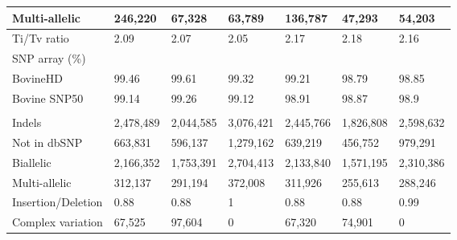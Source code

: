 \documentclass[../main.tex]{subfiles}
\begin{document}
\begin{landscape}
\begin{table}
\begin{tabular}{|l|l|l|l|l|l|l|}
    \hline
    Multi-allelic         & 246,220               & 67,328                      & 63,789                    & 136,787               & 47,293                      & 54,203                     \\ 
    \hline
    Ti/Tv ratio           & 2.09                  & 2.07                        & 2.05                      & 2.17                  & 2.18                        & 2.16                       \\ 
    \hline
    SNP array (\%)        &                       &                             &                           &                       &                             &                            \\ 
    \hline
    BovineHD              & 99.46                 & 99.61                       & 99.32                     & 99.21                 & 98.79                       & 98.85                      \\ 
    \hline
    Bovine SNP50          & 99.14                 & 99.26                       & 99.12                     & 98.91                 & 98.87                       & 98.9                       \\ 
    \hline
    \multicolumn{7}{|l|}{}                                                                                                                                                                     \\ 
    \hline
    Indels                & 2,478,489             & 2,044,585                   & 3,076,421                 & 2,445,766             & 1,826,808                   & 2,598,632                  \\ 
    \hline
    Not in dbSNP          & 663,831               & 596,137                     & 1,279,162                 & 639,219               & 456,752                     & 979,291                    \\ 
    \hline
    Biallelic             & 2,166,352             & 1,753,391                   & 2,704,413                 & 2,133,840             & 1,571,195                   & 2,310,386                  \\ 
    \hline
    Multi-allelic         & 312,137               & 291,194                     & 372,008                   & 311,926               & 255,613                     & 288,246                    \\ 
    \hline
    Insertion/Deletion    & 0.88                  & 0.88                        & 1                         & 0.88                  & 0.88                        & 0.99                       \\ 
    \hline
    Complex variation     & 67,525                & 97,604                      & 0                         & 67,320                & 74,901                      & 0                          \\
    \hline
    \end{tabular}
    \label{tab:varcount}
    \end{table}
\end{landscape}
\end{document}
